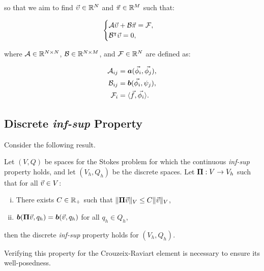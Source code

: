 so that we aim to find $\vec{\upsilon} \in \mathbb{R}^N$ and $\vec{\pi} \in \mathbb{R}^M$ such that:

\begin{gather} \label{matrix_stokes}
    \begin{cases}
        \mathcal{A} \vec{\upsilon} + \mathcal{B} \vec{\pi} = \mathcal{F}, \\
        \mathcal{B}^\intercal \vec{\upsilon} = 0,
    \end{cases}
\end{gather}

where $\mathcal{A} \in \mathbb{R}^{N \times N}$, $\mathcal{B} \in \mathbb{R}^{N \times M}$, and $\mathcal{F} \in \mathbb{R}^N$ are defined as:

\begin{align}
    \mathcal{A}_{ij} &= \bm{a}(\vec{\phi_i}, \vec{\phi_j}), \\ 
    \mathcal{B}_{ij} &= \bm{b}(\vec{\phi_i}, \psi_j), \\
    \mathcal{F}_i &= \langle \vec{f}, \vec{\phi_i} \rangle.
\end{align}

\newpage
\subsection{Discrete \textit{inf-sup} Property}

Consider the following result.

\begin{lemma}[Fortin] \label{fortin}
    Let $(V, Q)$ be spaces for the Stokes problem for which the continuous \textit{inf-sup} property holds, and let $(V_h, Q_h)$ be the discrete spaces. Let $\bm{\Pi}: V \rightarrow V_h$ such that for all $\vec{v} \in V$:
    \begin{enumerate}[i.]
        \item There exists $C \in \mathbb{R}_+$ such that $\lVert \bm{\Pi} \vec{v} \rVert_V \leq C \lVert \vec{v} \rVert_V$,
        \item $\bm{b}(\bm{\Pi} \vec{v}, q_h) = \bm{b}(\vec{v}, q_h)$ for all $q_h \in Q_h$,
    \end{enumerate}
    then the discrete \textit{inf-sup} property holds for $(V_h, Q_h)$.
\end{lemma}

Verifying this property for the Crouzeix-Raviart element is necessary to ensure its well-posedness.